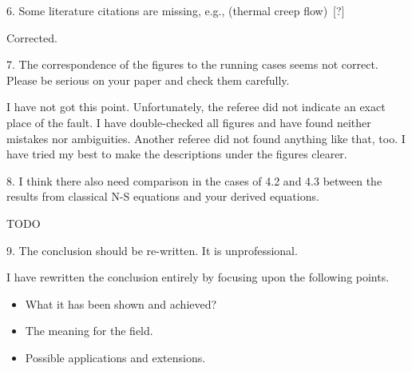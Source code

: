 \documentclass{article}
\begin{document}
\begin{quoting} 
6. Some literature citations are missing, e.g., (thermal creep flow)~[?]
\end{quoting}

Corrected.

\begin{quoting} 
7. The correspondence of the figures to the running cases seems not
correct. Please be serious on your paper and check them carefully.
\end{quoting}

I have not got this point. Unfortunately, the referee did not indicate an exact place of the fault.
I have double-checked all figures and have found neither mistakes nor ambiguities.
Another referee did not found anything like that, too.
I have tried my best to make the descriptions under the figures clearer.

\begin{quoting} 
8. I think there also need comparison in the cases of 4.2 and 4.3
between the results from classical N-S equations and your derived
equations.
\end{quoting}

{\Huge TODO}

\begin{quoting} 
9. The conclusion should be re-written. It is unprofessional.
\end{quoting}

I have rewritten the conclusion entirely by focusing upon the following points.
\begin{itemize} 
\item What it has been shown and achieved?
\item The meaning for the field.
\item Possible applications and extensions.
\end{itemize}
\end{document}
